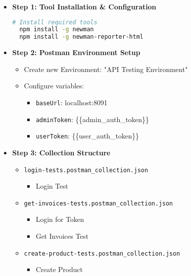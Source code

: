 \documentclass[12pt,a4paper]{article}
\begin{document}
  \begin{itemize}
      \item \textbf{Step 1: Tool Installation \& Configuration}
      \begin{lstlisting}[language=bash]
  # Install required tools
  npm install -g newman
  npm install -g newman-reporter-html
      \end{lstlisting}
      
      \item \textbf{Step 2: Postman Environment Setup}
      \begin{itemize}
          \item Create new Environment: "API Testing Environment"
          \item Configure variables:
          \begin{itemize}
              \item \texttt{baseUrl}: localhost:8091
              \item \texttt{adminToken}: \{\{admin\_auth\_token\}\}
              \item \texttt{userToken}: \{\{user\_auth\_token\}\}
          \end{itemize}
      \end{itemize}

      \item \textbf{Step 3: Collection Structure}
      \begin{itemize}
          \item \texttt{login-tests.postman\_collection.json}
          \begin{itemize}
              \item Login Test
          \end{itemize}
          
          \item \texttt{get-invoices-tests.postman\_collection.json}
          \begin{itemize}
              \item Login for Token
              \item Get Invoices Test
          \end{itemize}
          
          \item \texttt{create-product-tests.postman\_collection.json}
          \begin{itemize}
              \item Create Product
          \end{itemize}
          

\end{itemize}
\end{itemize}
\end{document}
